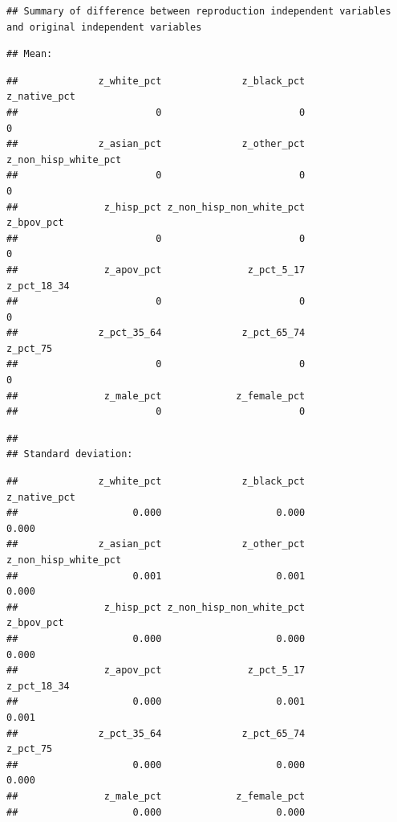 \documentclass[
]{article}
\begin{document}
\begin{verbatim}
## Summary of difference between reproduction independent variables and original independent variables
\end{verbatim}

\begin{verbatim}
## Mean:
\end{verbatim}

\begin{verbatim}
##              z_white_pct              z_black_pct             z_native_pct 
##                        0                        0                        0 
##              z_asian_pct              z_other_pct     z_non_hisp_white_pct 
##                        0                        0                        0 
##               z_hisp_pct z_non_hisp_non_white_pct               z_bpov_pct 
##                        0                        0                        0 
##               z_apov_pct               z_pct_5_17              z_pct_18_34 
##                        0                        0                        0 
##              z_pct_35_64              z_pct_65_74                 z_pct_75 
##                        0                        0                        0 
##               z_male_pct             z_female_pct 
##                        0                        0
\end{verbatim}

\begin{verbatim}
## 
## Standard deviation:
\end{verbatim}

\begin{verbatim}
##              z_white_pct              z_black_pct             z_native_pct 
##                    0.000                    0.000                    0.000 
##              z_asian_pct              z_other_pct     z_non_hisp_white_pct 
##                    0.001                    0.001                    0.000 
##               z_hisp_pct z_non_hisp_non_white_pct               z_bpov_pct 
##                    0.000                    0.000                    0.000 
##               z_apov_pct               z_pct_5_17              z_pct_18_34 
##                    0.000                    0.001                    0.001 
##              z_pct_35_64              z_pct_65_74                 z_pct_75 
##                    0.000                    0.000                    0.000 
##               z_male_pct             z_female_pct 
##                    0.000                    0.000
\end{verbatim}
\end{document}
